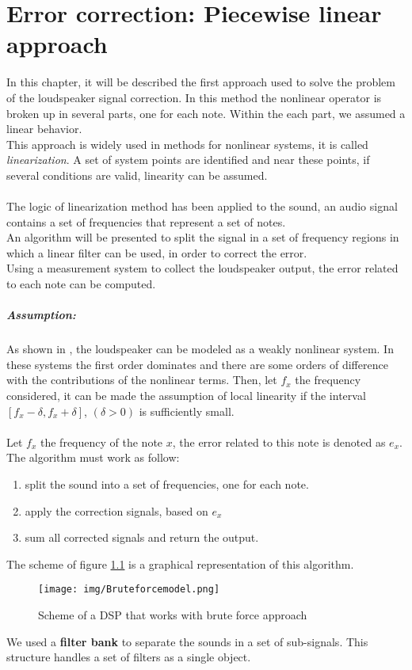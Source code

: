 \chapter{Error correction: Piecewise linear approach}
In this chapter, it will be described the first approach used to solve the problem of the loudspeaker signal correction. In this method the nonlinear operator is broken up in several parts, one for each note. Within the each part, we assumed a linear behavior.\\
This approach is widely used in methods for nonlinear systems, it is called \textit{linearization}. A set of system points are identified and near these points, if several conditions are valid, linearity can be assumed.\\\\
The logic of linearization method has been applied to the sound, an audio signal contains a set of frequencies that represent a set of notes.\\
An algorithm will be presented to split the signal in a set of frequency regions in which a linear filter can be used, in order to correct the error.\\
Using a measurement system to collect the loudspeaker output, the error related to each note can be computed.\\
\paragraph{Assumption:} As shown in \cite{loudspeakerlinearization}, the loudspeaker can be modeled as a weakly nonlinear system. In these systems the first order dominates and there are some orders of difference with the contributions of the nonlinear terms. Then, let $f_x$ the frequency considered, it can be made the assumption of local linearity if the interval $[f_x-\delta, f_x + \delta]$, $(\delta>0)$  is sufficiently small.\\\\  
Let $f_x$ the frequency of the note $x$, the error related to this note is denoted as $e_x$.\\
The algorithm must work as follow:
\begin{enumerate}
\item split the sound into a set of frequencies, one for each note.
\item apply the correction signals, based on $e_x$
\item sum all corrected signals and return the output.
\end{enumerate}
The scheme of figure \ref{fig:bruteforcemodel} is a graphical representation of this algorithm.\\
\begin{figure}[h]\centering
\texttt{[image: img/Bruteforcemodel.png]} 
\caption{Scheme of a DSP that works with brute force approach} \label{fig:bruteforcemodel}
\end{figure}
We used a \textbf{filter bank} to separate the sounds in a set of sub-signals. This structure handles a set of filters as a single object.
